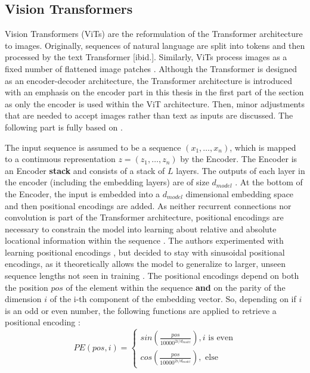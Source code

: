 \subsection{Vision Transformers}
Vision Transformers (ViTs) are the reformulation of the Transformer architecture \cite{Vaswani2017} to images.
Originally, sequences of natural language are split into tokens and then processed by the text Transformer [ibid.].  
Similarly, ViTs process images as a fixed number of flattened image patches \citep{Dosovitskiy2020}.
Although the Transformer is designed as an encoder-decoder architecture, the Transformer architecture is introduced with an emphasis on the encoder part in this thesis in the first part of the section as only the encoder is used within the ViT architecture.
Then, minor adjustments that are needed to accept images rather than text as inputs are discussed.
The following part is fully based on \cite{Vaswani2017,Dosovitskiy2020}.
\par
The input sequence is assumed to be a sequence $(x_1,\dots,x_n)$, which is mapped to a continuous representation $z=(z_1,\dots,z_n)$ by the Encoder.
The Encoder is an Encoder \textbf{stack} and consists of a stack of $L$ layers.
The outputs of each layer in the encoder (including the embedding layers) are of size $d_{model}$ \citep{Vaswani2017}.
At the bottom of the Encoder, the input is embedded into a $d_{model}$ dimensional embedding space and then positional encodings are added.
As neither recurrent connections nor convolution is part of the Transformer architecture, positional encodings are necessary to constrain the model into learning about relative and absolute locational information within the sequence \citep{Vaswani2017}.
The authors experimented with learning positional encodings \citep{Gehring2018}, but decided to stay with sinusoidal positional encodings, as it theoretically allows the model to generalize to larger, unseen sequence lengths not seen in training \citep{Vaswani2017}.
The positional encodings depend on both the position $pos$ of the element within the sequence \textbf{and} on the parity of the dimension $i$ of the i-th component of the embedding vector.
So, depending on if $i$ is an odd or even number, the following functions are applied to retrieve a positional encoding \citep{Vaswani2017}:
\begin{equation}
	PE(pos, i) = 
	\begin{cases}
		sin(\frac{pos}{10000^{2i / d_{model}}}), i \text{ is even} \\
		cos(\frac{pos}{10000^{2i / d_{model}}}), \text{ else}
	\end{cases}
\end{equation}
